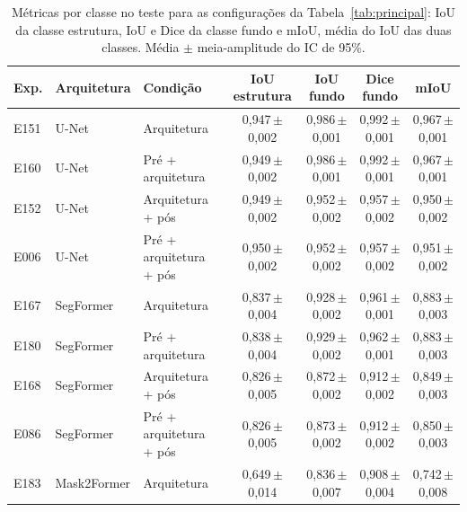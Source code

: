 \begin{table}[htbp]
\centering
\caption{Métricas por classe no teste para as configurações da Tabela~\ref{tab:principal}: IoU da classe estrutura, IoU e Dice da classe fundo e mIoU, média do IoU das duas classes. Média $\pm$ meia-amplitude do IC de 95\%.}
\label{tab:classes}
\footnotesize\setlength{\tabcolsep}{3pt}
\begin{sbcfitwidth}
\begin{tabular}{lllcccc}
\toprule
Exp. & Arquitetura & Condição & IoU estrutura & IoU fundo & Dice fundo & mIoU \\
\midrule
E151 & U-Net & Arquitetura & 0{,}947\,{\scriptsize$\pm$0{,}002} & 0{,}986\,{\scriptsize$\pm$0{,}001} & 0{,}992\,{\scriptsize$\pm$0{,}001} & 0{,}967\,{\scriptsize$\pm$0{,}001} \\
E160 & U-Net & Pré + arquitetura & 0{,}949\,{\scriptsize$\pm$0{,}002} & 0{,}986\,{\scriptsize$\pm$0{,}001} & 0{,}992\,{\scriptsize$\pm$0{,}001} & 0{,}967\,{\scriptsize$\pm$0{,}001} \\
E152 & U-Net & Arquitetura + pós & 0{,}949\,{\scriptsize$\pm$0{,}002} & 0{,}952\,{\scriptsize$\pm$0{,}002} & 0{,}957\,{\scriptsize$\pm$0{,}002} & 0{,}950\,{\scriptsize$\pm$0{,}002} \\
E006 & U-Net & Pré + arquitetura + pós & 0{,}950\,{\scriptsize$\pm$0{,}002} & 0{,}952\,{\scriptsize$\pm$0{,}002} & 0{,}957\,{\scriptsize$\pm$0{,}002} & 0{,}951\,{\scriptsize$\pm$0{,}002} \\
\midrule
E167 & SegFormer & Arquitetura & 0{,}837\,{\scriptsize$\pm$0{,}004} & 0{,}928\,{\scriptsize$\pm$0{,}002} & 0{,}961\,{\scriptsize$\pm$0{,}001} & 0{,}883\,{\scriptsize$\pm$0{,}003} \\
E180 & SegFormer & Pré + arquitetura & 0{,}838\,{\scriptsize$\pm$0{,}004} & 0{,}929\,{\scriptsize$\pm$0{,}002} & 0{,}962\,{\scriptsize$\pm$0{,}001} & 0{,}883\,{\scriptsize$\pm$0{,}003} \\
E168 & SegFormer & Arquitetura + pós & 0{,}826\,{\scriptsize$\pm$0{,}005} & 0{,}872\,{\scriptsize$\pm$0{,}002} & 0{,}912\,{\scriptsize$\pm$0{,}002} & 0{,}849\,{\scriptsize$\pm$0{,}003} \\
E086 & SegFormer & Pré + arquitetura + pós & 0{,}826\,{\scriptsize$\pm$0{,}005} & 0{,}873\,{\scriptsize$\pm$0{,}002} & 0{,}912\,{\scriptsize$\pm$0{,}002} & 0{,}850\,{\scriptsize$\pm$0{,}003} \\
\midrule
E183 & Mask2Former & Arquitetura & 0{,}649\,{\scriptsize$\pm$0{,}014} & 0{,}836\,{\scriptsize$\pm$0{,}007} & 0{,}908\,{\scriptsize$\pm$0{,}004} & 0{,}742\,{\scriptsize$\pm$0{,}008} \\

\end{tabular}
\end{sbcfitwidth}
\end{table}
